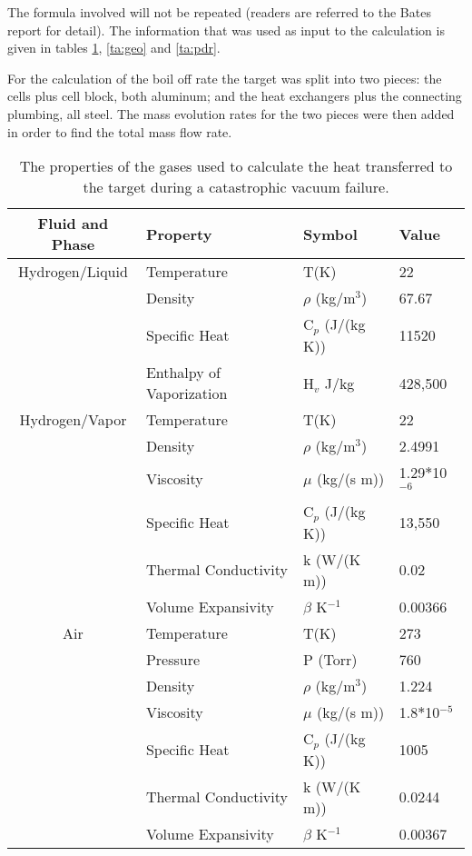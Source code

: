 {The formula involved will not be repeated (readers are referred to 
the Bates report for detail).
The information that was used as input
to the calculation is given in tables \ref{ta:gas}, \ref{ta:geo}
and \ref{ta:pdr}.

For the calculation of the boil off rate the target was split into
two pieces: the cells plus cell block, both aluminum; and the heat exchangers
plus the connecting plumbing, all steel. The mass evolution rates
for the two pieces were then added in order to find the total
mass flow rate.

\begin{table}[htb]
\begin{center}
\begin{tabular}{|c|l|l|l|} \hline
Fluid and Phase & Property & Symbol & Value \\ \hline
Hydrogen/Liquid & Temperature & T(K) & 22 \\ \hline
 & Density & $\rho$ (kg/m$^3$) & 67.67 \\ \hline
 & Specific Heat & C$_p$ (J/(kg K)) & 11520 \\ \hline
 & Enthalpy of Vaporization & H$_v$ J/kg & 428,500 \\ \hline
Hydrogen/Vapor & Temperature & T(K) & 22 \\ \hline
 & Density & $\rho$ (kg/m$^3$) & 2.4991 \\ \hline
 & Viscosity & $\mu$ (kg/(s m)) & 1.29$*$10$^{-6}$ \\ \hline
 & Specific Heat & C$_p$ (J/(kg K)) & 13,550 \\ \hline
 & Thermal Conductivity & k (W/(K m)) & 0.02 \\ \hline
 & Volume Expansivity & $\beta$ K$^{-1}$ & 0.00366 \\ \hline
Air & Temperature & T(K) & 273 \\ \hline
 & Pressure & P (Torr) & 760 \\ \hline
 & Density & $\rho$ (kg/m$^3$) & 1.224 \\ \hline
 & Viscosity & $\mu$ (kg/(s m)) & 1.8$*$10$^{-5}$ \\ \hline
 & Specific Heat & C$_p$ (J/(kg K)) & 1005 \\ \hline
 & Thermal Conductivity & k (W/(K m)) & 0.0244 \\ \hline
 & Volume Expansivity & $\beta$ K$^{-1}$ & 0.00367 \\ \hline
\end{tabular}
\end{center}
\caption[Cryotarget: Gas Properties]{ The properties of the gases used to calculate
the heat transferred to the target during a catastrophic vacuum failure.}
\label{ta:gas}
\end{table}

}
